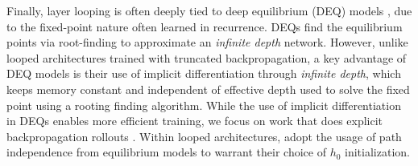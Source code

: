 Finally, layer looping is often deeply tied to deep equilibrium (DEQ) models \citep{bai2019deepequilibriummodels,bai2022neural}, due to the fixed-point nature often learned in recurrence. DEQs find the equilibrium points via root-finding to approximate an \emph{infinite depth} network. However, unlike looped architectures trained with truncated backpropagation, a key advantage of DEQ models is their use of implicit differentiation through \emph{infinite depth}, which keeps memory constant and independent of effective depth used to solve the fixed point using a rooting finding algorithm. While the use of implicit differentiation in DEQs enables more efficient training, we focus on work that does explicit backpropagation rollouts \citep{geiping_scaling_2025, mcleish_retrofitted_recurrence, bansalEndtoendAlgorithmSynthesis2022, yang2024loopedtransformersbetterlearning}.
Within looped architectures, \citet{geiping_scaling_2025,mcleish_retrofitted_recurrence} adopt the usage of path independence from equilibrium models \citep{anilPathIndependentEquilibrium} to warrant their choice of $h_0$ initialization.
